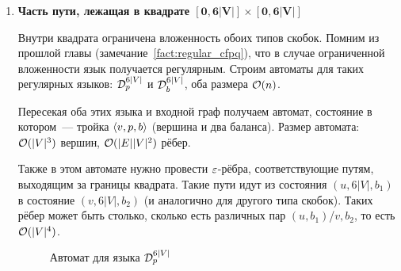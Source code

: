 \begin{enumerate}
    \item {\bf Часть пути, лежащая в квадрате $\mathbf{[0, 6|V|] \times [0, 6|V|]}$}

    Внутри квадрата ограничена вложенность обоих типов скобок. Помним из прошлой главы (замечание~\ref{fact:regular_cfpq}), что в случае ограниченной вложенности язык получается регулярным. Строим автоматы для таких регулярных языков: $\mathcal{D}_p^{6|V|}$ и $\mathcal{D}_b^{6|V|}$, оба размера $\mathcal{O}(n)$.

    Пересекая оба этих языка и входной граф получаем автомат, состояние в котором~--- тройка $\langle v, p, b \rangle$ (вершина и два баланса). Размер автомата: $\mathcal{O}(|V|^3)$ вершин, $\mathcal{O}(|E||V|^2)$ рёбер.

    Также в этом автомате нужно провести $\varepsilon$-рёбра, соответствующие путям, выходящим за границы квадрата. Такие пути идут из состояния $(u, 6|V|, b_1)$ в состояние $(v, 6|V|, b_2)$ (и аналогично для другого типа скобок). Таких рёбер может быть столько, сколько есть различных пар $(u, b_1)$/$v, b_2$, то есть $\mathcal{O}(|V|^4)$.


    \begin{figure}[h]
      \caption{Автомат для языка $\mathcal{D}_p^{6|V|}$}
      \label{img:dyck_6n_dfa}
    \end{figure}


\end{enumerate}
